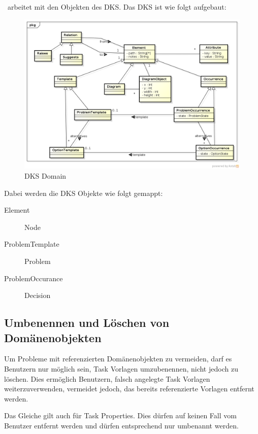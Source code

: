 			\eeppi\ arbeitet mit den Objekten des DKS. Das DKS ist wie folgt aufgebaut:
			\begin{figure}[H]
				\includegraphics[width=\linewidth]{architecture/media/img/dksDomain.png}
				\centering
				\caption[DKS Domain\newline 
				]{DKS Domain}
				\label{fig:dksDomain}
			\end{figure}
			
			Dabei werden die DKS Objekte wie folgt gemappt:
			\begin{description}
				\item[Element] Node
				\item[ProblemTemplate] Problem
				\item[ProblemOccurance] Decision			
			\end{description}						
			
			
		\subsection{Umbenennen und Löschen von Domänenobjekten}
			Um Probleme mit referenzierten Domänenobjekten zu vermeiden,
			darf es Benutzern nur möglich sein, Task Vorlagen umzubenennen,
			nicht jedoch zu löschen.
			Dies ermöglich Benutzern, 
			falsch angelegte Task Vorlagen weiterzuverwenden, vermeidet jedoch, 
			das bereits referenzierte Vorlagen entfernt werden.
			
			Das Gleiche gilt auch für Task Properties.
			Dies dürfen auf keinen Fall vom Benutzer entfernt werden 
			und dürfen entsprechend nur umbenannt werden.
			
